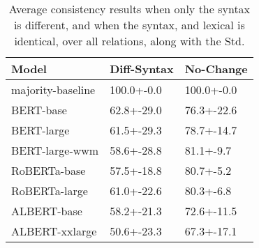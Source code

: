 \begin{table}[t]
    \centering
\begin{tabular}{lll}
\toprule
Model & Diff-Syntax & No-Change \\
\midrule
majority-baseline &            100.0+-0.0 &            100.0+-0.0 \\
\midrule
BERT-base         &            62.8+-29.0 &            76.3+-22.6 \\
BERT-large        &            61.5+-29.3 &            78.7+-14.7 \\
BERT-large-wwm    &            58.6+-28.8 &             81.1+-9.7 \\
\midrule
RoBERTa-base      &            57.5+-18.8 &             80.7+-5.2 \\
RoBERTa-large     &            61.0+-22.6 &             80.3+-6.8 \\
\midrule
ALBERT-base       &            58.2+-21.3 &            72.6+-11.5 \\
ALBERT-xxlarge    &            50.6+-23.3 &            67.3+-17.1 \\
\bottomrule
\end{tabular}

    \caption{Average consistency results when only the syntax is different, and when the syntax, and lexical is identical, over all relations, along with the Std.}
    \label{tab:syntax_results}
\end{table}